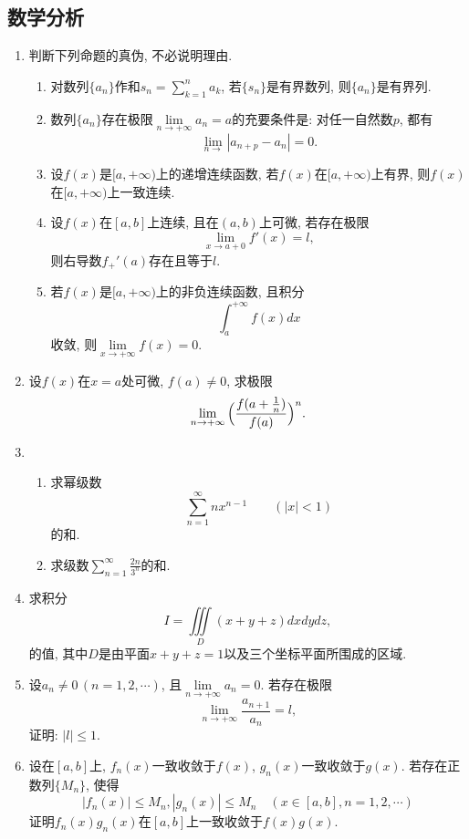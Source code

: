 \documentclass[12pt,a4paper,openany]{book}
\begin{document}
\subsection{数学分析}
\begin{enumerate}
\item 判断下列命题的真伪, 不必说明理由.
\begin{enumerate}
\item 对数列$\{a_n\}$作和$s_n = \sum\limits_{k=1}^{n}{a_k}$, 若$\{s_n\}$是有界数列, 则$\{a_n\}$是有界列.

\item 数列$\{a_n\}$存在极限$\lim\limits_{n \rightarrow +\infty}{a_n} = a$的充要条件是: 对任一自然数$p$, 都有
\[
\lim_{n \rightarrow }{|a_{n+p} - a_n|} = 0.
\]

\item 设$f(x)$是$[a, +\infty)$上的递增连续函数, 若$f(x)$在$[a, +\infty)$上有界, 则$f(x)$在$[a, +\infty)$上一致连续.

\item 设$f(x)$在$[a, b]$上连续, 且在$(a, b)$上可微, 若存在极限
\[
\lim_{x \rightarrow a+0}{f'(x)} = l,
\]
则右导数$f_+'(a)$存在且等于$l.$

\item 若$f(x)$是$[a, +\infty)$上的非负连续函数, 且积分
\[
\int_{a}^{+\infty}{f(x)dx}
\]
收敛, 则$\lim\limits_{x \rightarrow +\infty}{f(x)} = 0$.
\end{enumerate}

\item 设$f(x)$在$x = a$处可微, $f(a) \neq 0$, 求极限
\[
\lim_{n \rightarrow +\infty}{\Bigl{(} \frac{f(a + \frac{1}{n})}{f(a)} \Bigr{)}^n}.
\]

\item 
\begin{enumerate}
\item 求幂级数
\[
\sum_{n=1}^{\infty}{nx^{n-1}} \qquad (|x| < 1)
\]
的和.

\item 求级数$\sum\limits_{n=1}^{\infty}{\displaystyle\frac{2n}{3^n}}$的和.
\end{enumerate}

\item 求积分
\[
I = \iiint\limits_{D}{(x + y + z)dxdydz},
\]
的值, 其中$D$是由平面$x + y + z = 1$以及三个坐标平面所围成的区域.

\item 设$a_n \neq 0\,(n=1,2,\cdots)$, 且$\lim\limits_{n \rightarrow +\infty}{a_n} = 0$. 若存在极限
\[
\lim_{n \rightarrow +\infty}{\frac{a_{n+1}}{a_n}} = l,
\]
证明: $|l| \le 1$.

\item 设在$[a, b]$上, $f_n(x)$一致收敛于$f(x)$, $g_n(x)$一致收敛于$g(x)$. 若存在正数列$\{M_n\}$, 使得
\[
|f_n(x)| \le M_n, |g_n(x)| \le M_n \quad (x \in [a, b], n = 1, 2, \cdots)
\]
证明$f_n(x)g_n(x)$在$[a, b]$上一致收敛于$f(x)g(x)$.
\end{enumerate}
\end{document}
